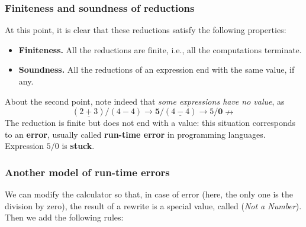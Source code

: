 %
\begin{frame}
\frametitle{Finiteness and soundness of reductions}

At this point, it is clear that these reductions satisfy the following
properties:
\begin{itemize}
 
  \item \textbf{Finiteness.} All the reductions are finite, i.e., all
    the computations terminate.

  \item \textbf{Soundness.} All the reductions of an expression end
    with the same value, if any.
  
\end{itemize}

About the second point, note indeed that \emph{some expressions have
  no value}, as
\[
(\underline{2+3})/(4-4) \rightarrow \textbf{5}/(\underline{4-4})
\rightarrow 5/\textbf{0} \nrightarrow
\]
The reduction is finite but does not end with a value: this situation
corresponds to an \textbf{error}, usually called \textbf{run-time
  error} in programming languages. Expression \(5/0\) is
\textbf{stuck}.

\end{frame}

%
\begin{frame}
\frametitle{Another model of run-time errors}

We can modify the calculator so that, in case of error (here, the only
one is the division by zero), the result of a rewrite is a special
value, called \NaN (\emph{Not a Number}). Then we add the following
rules:

\end{frame}

